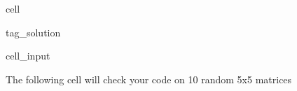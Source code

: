 \documentclass[letterpaper,10pt,english]{jupyterBook}
\begin{document}
\begin{sphinxuseclass}{cell}
\begin{sphinxuseclass}{tag_solution}\begin{sphinxVerbatimInput}

\begin{sphinxuseclass}{cell_input}
\begin{sphinxVerbatim}[commandchars=\\\{\}]
\end{sphinxVerbatim}

\end{sphinxuseclass}\end{sphinxVerbatimInput}

\end{sphinxuseclass}
\end{sphinxuseclass}
\sphinxAtStartPar
The following cell will check your code on 10 random 5x5 matrices
\end{document}
